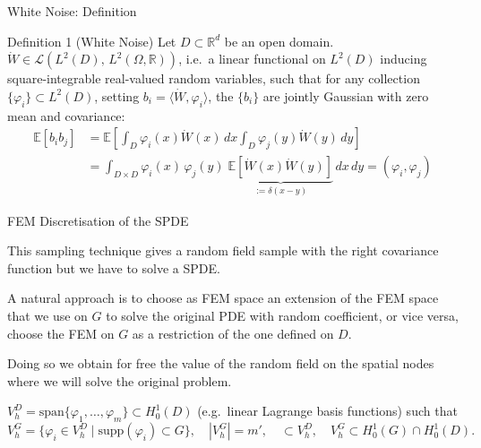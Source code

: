 \documentclass[
  english,            %
  aspectratio=169,    %
]{tumbeamer}
\begin{document}

\begin{frame}{White Noise: Definition}

\begin{block}{Definition 1 (White Noise)}
Let $D \subset \mathbb{R}^d$ be an open domain.
$\dot{W} \in \mathcal{L}(L^2(D),\,L^2(\Omega,\mathbb{R}))$, i.e.\ a linear functional on
$L^2(D)$ inducing square-integrable real-valued random variables, such that for any
collection $\{\varphi_i\} \subset L^2(D)$, setting $b_i = \langle\dot{W}, \varphi_i\rangle$,
the $\{b_i\}$ are jointly Gaussian with zero mean and covariance:
\begin{align}
  \mathbb{E}[b_i b_j]
  &= \mathbb{E}\!\left[\int_D \varphi_i(x)\dot{W}(x)\,dx
                       \int_D \varphi_j(y)\dot{W}(y)\,dy\right] \nonumber\\
  &= \int_{D\times D} \varphi_i(x)\,\varphi_j(y)\;
     \underbrace{\mathbb{E}[\dot{W}(x)\dot{W}(y)]}_{:= \delta(x-y)}
     \,dx\,dy
  = (\varphi_i,\varphi_j)
\end{align}
\end{block}

\end{frame}


\begin{frame}{FEM Discretisation of the SPDE}

This sampling technique gives a random field sample with the right covariance function but we have to solve a SPDE. 

\bigskip
A natural approach is to choose as FEM space an extension of the FEM space 
that we use on $G$ to solve the original PDE with random coefficient, or vice versa, choose the FEM on $G$ as a restriction of the one defined on $D$.

\bigskip
Doing so we obtain for free the value of the random field on the spatial nodes where we will solve the original problem.
\bigskip

$V_h^D = \mathrm{span}\{\varphi_1,\ldots,\varphi_m\} \subset H^1_0(D)$
(e.g.\ linear Lagrange basis functions) such that
\begin{equation}
  V_h^G = \{\varphi_i \in V_h^D \mid \mathrm{supp}(\varphi_i) \subset G\}, \quad |V_h^G| = m', \quad
  \subset V_h^D,\quad V_h^G \subset H_0^1(G) \cap H^1_0(D).
\end{equation}

\end{frame}
\end{document}

